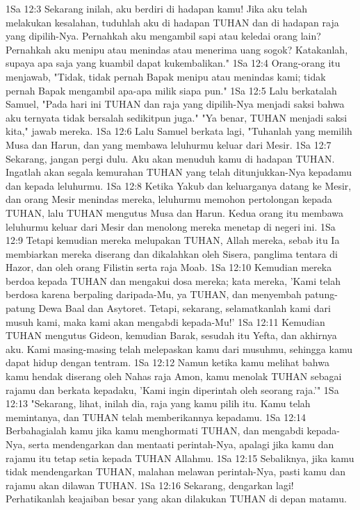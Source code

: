 1Sa 12:3  Sekarang inilah, aku berdiri di hadapan kamu! Jika aku telah melakukan kesalahan, tuduhlah aku di hadapan TUHAN dan di hadapan raja yang dipilih-Nya. Pernahkah aku mengambil sapi atau keledai orang lain? Pernahkah aku menipu atau menindas atau menerima uang sogok? Katakanlah, supaya apa saja yang kuambil dapat kukembalikan."
1Sa 12:4  Orang-orang itu menjawab, "Tidak, tidak pernah Bapak menipu atau menindas kami; tidak pernah Bapak mengambil apa-apa milik siapa pun."
1Sa 12:5  Lalu berkatalah Samuel, "Pada hari ini TUHAN dan raja yang dipilih-Nya menjadi saksi bahwa aku ternyata tidak bersalah sedikitpun juga." "Ya benar, TUHAN menjadi saksi kita," jawab mereka.
1Sa 12:6  Lalu Samuel berkata lagi, "Tuhanlah yang memilih Musa dan Harun, dan yang membawa leluhurmu keluar dari Mesir.
1Sa 12:7  Sekarang, jangan pergi dulu. Aku akan menuduh kamu di hadapan TUHAN. Ingatlah akan segala kemurahan TUHAN yang telah ditunjukkan-Nya kepadamu dan kepada leluhurmu.
1Sa 12:8  Ketika Yakub dan keluarganya datang ke Mesir, dan orang Mesir menindas mereka, leluhurmu memohon pertolongan kepada TUHAN, lalu TUHAN mengutus Musa dan Harun. Kedua orang itu membawa leluhurmu keluar dari Mesir dan menolong mereka menetap di negeri ini.
1Sa 12:9  Tetapi kemudian mereka melupakan TUHAN, Allah mereka, sebab itu Ia membiarkan mereka diserang dan dikalahkan oleh Sisera, panglima tentara di Hazor, dan oleh orang Filistin serta raja Moab.
1Sa 12:10  Kemudian mereka berdoa kepada TUHAN dan mengakui dosa mereka; kata mereka, 'Kami telah berdosa karena berpaling daripada-Mu, ya TUHAN, dan menyembah patung-patung Dewa Baal dan Asytoret. Tetapi, sekarang, selamatkanlah kami dari musuh kami, maka kami akan mengabdi kepada-Mu!'
1Sa 12:11  Kemudian TUHAN mengutus Gideon, kemudian Barak, sesudah itu Yefta, dan akhirnya aku. Kami masing-masing telah melepaskan kamu dari musuhmu, sehingga kamu dapat hidup dengan tentram.
1Sa 12:12  Namun ketika kamu melihat bahwa kamu hendak diserang oleh Nahas raja Amon, kamu menolak TUHAN sebagai rajamu dan berkata kepadaku, 'Kami ingin diperintah oleh seorang raja.'"
1Sa 12:13  "Sekarang, lihat, inilah dia, raja yang kamu pilih itu. Kamu telah memintanya, dan TUHAN telah memberikannya kepadamu.
1Sa 12:14  Berbahagialah kamu jika kamu menghormati TUHAN, dan mengabdi kepada-Nya, serta mendengarkan dan mentaati perintah-Nya, apalagi jika kamu dan rajamu itu tetap setia kepada TUHAN Allahmu.
1Sa 12:15  Sebaliknya, jika kamu tidak mendengarkan TUHAN, malahan melawan perintah-Nya, pasti kamu dan rajamu akan dilawan TUHAN.
1Sa 12:16  Sekarang, dengarkan lagi! Perhatikanlah keajaiban besar yang akan dilakukan TUHAN di depan matamu.
